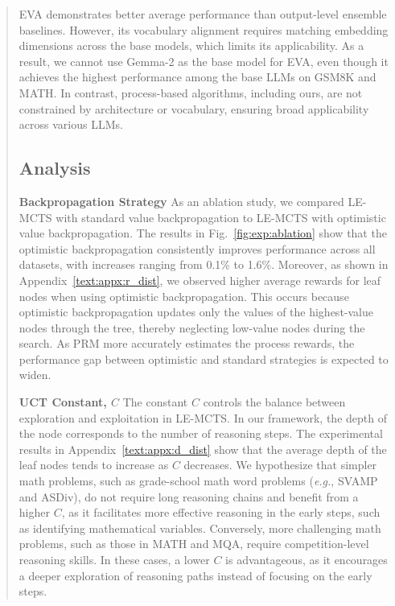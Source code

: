 \documentclass[11pt]{article}
\begin{document}
\begin{abstract}
EVA demonstrates better average performance than output-level ensemble baselines.
However, its vocabulary alignment requires matching embedding dimensions across the base models, which limits its applicability. 
As a result, we cannot use Gemma-2 as the base model for EVA, even though it achieves the highest performance among the base LLMs on GSM8K and MATH. 
In contrast, process-based algorithms, including ours, are not constrained by architecture or vocabulary, ensuring broad applicability across various LLMs.

\subsection{Analysis}
\label{text:experiment:cost_analysis}
\medskip
\par \noindent \textbf{Backpropagation Strategy} \;
As an ablation study, we compared LE-MCTS with standard value backpropagation to LE-MCTS with optimistic value backpropagation. 
The results in Fig.~\ref{fig:exp:ablation} show that the optimistic backpropagation consistently improves performance across all datasets, with increases ranging from 0.1\% to 1.6\%.
Moreover, as shown in Appendix~\ref{text:appx:r_dist}, we observed higher average rewards for leaf nodes when using optimistic backpropagation.
This occurs because optimistic backpropagation updates only the values of the highest-value nodes through the tree, thereby neglecting low-value nodes during the search. 
As PRM more accurately estimates the process rewards, the performance gap between optimistic and standard strategies is expected to widen.
\medskip

\par \noindent \textbf{UCT Constant, \( C \)} \;
The constant \( C \) controls the balance between exploration and exploitation in LE-MCTS. 
In our framework, the depth of the node corresponds to the number of reasoning steps.
The experimental results in Appendix~\ref{text:appx:d_dist} show that the average depth of the leaf nodes tends to increase as \( C \) decreases.
We hypothesize that simpler math problems, such as grade-school math word problems (\textit{e.g.}, SVAMP and ASDiv), do not require long reasoning chains and benefit from a higher \( C \), as it facilitates more effective reasoning in the early steps, such as identifying mathematical variables. 
Conversely, more challenging math problems, such as those in MATH and MQA, require competition-level reasoning skills. 
In these cases, a lower \( C \) is advantageous, as it encourages a deeper exploration of reasoning paths instead of focusing on the early steps.


\end{abstract}
\end{document}
